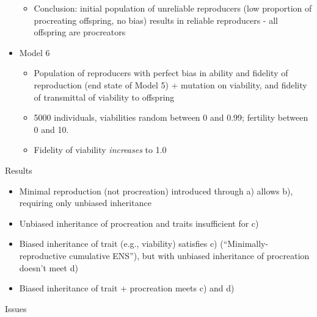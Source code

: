 \begin{itemize}
\begin{itemize}
\begin{itemize}
		\end{itemize}
		\item
		
		Conclusion: initial population of unreliable reproducers (low
		proportion of procreating offspring, no bias) results in
		reliable reproducers - all offspring are procreators
		
	\end{itemize}
	\item
	
	Model 6
	
	
	\begin{itemize}
		\item
		
		Population of reproducers with perfect bias in ability and
		fidelity of reproduction (end state of Model 5) + mutation on
		viability, and fidelity of transmittal of viability to offspring
		
		\item
		
		5000 individuals, viabilities random between 0 and 0.99;
		fertility between 0 and 10.
			\item
			
			Fidelity of viability \emph{increases} to 1.0

	\end{itemize}
\end{itemize}
		
Results
		
		
\begin{itemize}
	\item
	
	Minimal reproduction (not procreation) introduced through a)
	allows b), requiring only unbiased inheritance
	
	\item
	
	Unbiased inheritance of procreation and traits insufficient for c)
	
	\item
	
	Biased inheritance of trait (e.g., viability) satisfies c)
	(``Minimally-reproductive cumulative ENS''), but with unbiased
	inheritance of procreation doesn't meet d)
	
	\item
	
	Biased inheritance of trait + procreation meets c) and d)
	
\end{itemize}
		
	
Issues
	
